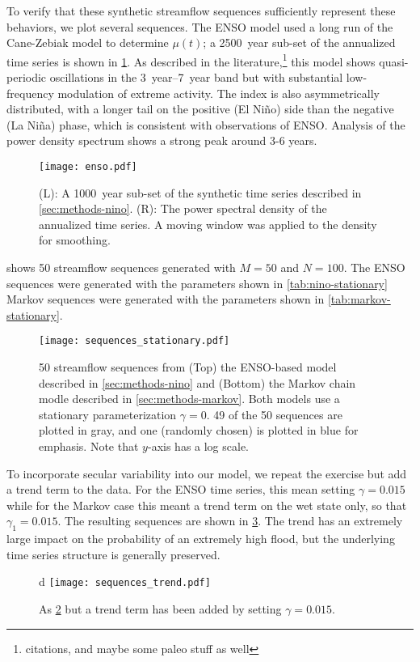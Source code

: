 \documentclass[12pt]{article}
\begin{document}
To verify that these synthetic streamflow sequences sufficiently represent these behaviors, we plot several sequences.
The ENSO model used a long run of the Cane-Zebiak model \citep{Zebiak1987,Ramesh2017} to determine \(\mu(t)\); a \SI{2500}{year} sub-set of the annualized time series is shown in \cref{fig:enso-ts}.
As described in the literature,\footnote{citations, and maybe some paleo stuff as well} this model shows quasi-periodic oscillations in the \SIrange{3}{7}{year} band but with substantial low-frequency modulation of extreme activity.
The index is also asymmetrically distributed, with a longer tail on the positive (El Ni\~{n}o) side than the negative (La Ni\~{n}a) phase, which is consistent with observations of ENSO.
Analysis of the power density spectrum shows a strong peak around 3-6 years.
\begin{figure}
  \texttt{[image: enso.pdf]}
  \caption{
    (L): A \SI{1000}{year} sub-set of the synthetic time series described in \cref{sec:methods-nino}.
    (R): The power spectral density of the annualized time series. A moving window was applied to the density for smoothing.\label{fig:enso-ts}
  }
\end{figure}

 shows 50 streamflow sequences generated with $M=50$ and $N=100$.
The ENSO sequences were generated with the parameters shown in \cref{tab:nino-stationary} Markov sequences were generated with the parameters shown in \cref{tab:markov-stationary}.
\begin{figure}[b]
  \texttt{[image: sequences\_stationary.pdf]}  
  \caption{
    50 streamflow sequences from (Top) the ENSO-based model described in \cref{sec:methods-nino} and (Bottom) the Markov chain modle described in \cref{sec:methods-markov}.
    Both models use a stationary parameterization $\gamma=0$.
    49 of the 50 sequences are plotted in gray, and one (randomly chosen) is plotted in blue for emphasis.
    Note that $y$-axis has a log scale.\label{fig:stationary-sequences}
  }
\end{figure}

To incorporate secular variability into our model, we repeat the exercise but add a trend term to the data.
For the ENSO time series, this mean setting \(\gamma=0.015\) while for the Markov case this meant a trend term on the wet state only, so that \(\gamma_1=0.015\).
The resulting sequences are shown in \cref{fig:trend-sequences}.
The trend has an extremely large impact on the probability of an extremely high flood, but the underlying time series structure is generally preserved.
\begin{figure}[b]d
  \texttt{[image: sequences\_trend.pdf]}
  \caption{
    As \cref{fig:stationary-sequences} but a trend term has been added by setting \(\gamma=0.015\).\label{fig:trend-sequences}
  }
\end{figure}
\end{document}
